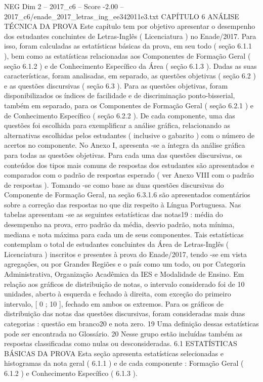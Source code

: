 \begin{textsample}{NEG Dim 2 – 2017\_c6 – Score -2.00 – 2017\_c6/enade\_2017\_letras\_ing\_ee342011e3.txt}  \label{ex:f2_neg_166}
CAPÍTULO 6 ANÁLISE TÉCNICA DA PROVA Este capítulo tem por objetivo apresentar o desempenho dos estudantes concluintes de Letras-Inglês ( Licenciatura ) no Enade/2017.
Para isso, foram calculadas as estatísticas básicas da prova, em seu todo ( seção 6.1.1 ), bem como as estatísticas relacionadas aos Componentes de Formação Geral ( seção 6.1.2 ) e de Conhecimento Específico da Área ( seção 6.1.3 ).
Dadas as suas características, foram analisadas, em separado, as questões objetivas ( seção 6.2 ) e as questões discursivas ( seção 6.3 ).
Para as questões objetivas, foram disponibilizados os índices de facilidade e de discriminação ponto-bisserial, também em separado, para os Componentes de Formação Geral ( seção 6.2.1 ) e de Conhecimento Específico ( seção 6.2.2 ).
De cada componente, uma das questões foi escolhida para exemplificar a análise gráfica, relacionando as alternativas escolhidas pelos estudantes ( inclusive o gabarito ) com o número de acertos no componente.
No Anexo I, apresenta -se a íntegra da análise gráfica para todas as questões objetivas.
Para cada uma das questões discursivas, os conteúdos dos tipos mais comuns de respostas dos estudantes são apresentados e comparados com o padrão de respostas esperado ( ver Anexo VIII com o padrão de respostas ).
Tomando -se como base as duas questões discursivas do Componente de Formação Geral, na seção 6.3.1.6 são apresentados comentários sobre a correção das respostas no que diz respeito à Língua Portuguesa.
Nas tabelas apresentam -se as seguintes estatísticas das notas19 : média do desempenho na prova, erro padrão da média, desvio padrão, nota mínima, mediana e nota máxima para cada um de seus componentes.
Tais estatísticas contemplam o total de estudantes concluintes da Área de Letras-Inglês ( Licenciatura ) inscritos e presentes à prova do Enade/2017, tendo -se em vista agregações, ou por Grandes Regiões e o país como um todo, ou por Categoria Administrativa, Organização Acadêmica da IES e Modalidade de Ensino.
Em relação aos gráficos de distribuição de notas, o intervalo considerado foi de 10 unidades, aberto à esquerda e fechado à direita, com exceção do primeiro intervalo, [ 0 ; 10 ], fechado em ambos os extremos.
Para os gráficos de distribuição das notas das questões discursivas, foram consideradas mais duas categorias : questão em branco20 e nota zero. 19 Uma definição dessas estatísticas pode ser encontrada no Glossário. 20 Nesse grupo estão incluídas também as respostas classificadas como nulas ou desconsideradas. 6.1 ESTATÍSTICAS BÁSICAS DA PROVA Esta seção apresenta estatísticas selecionadas e histogramas da nota geral ( 6.1.1 ) e de cada componente : Formação Geral ( 6.1.2 ) e Conhecimento Específico ( 6.1.3 ).

\end{textsample}
